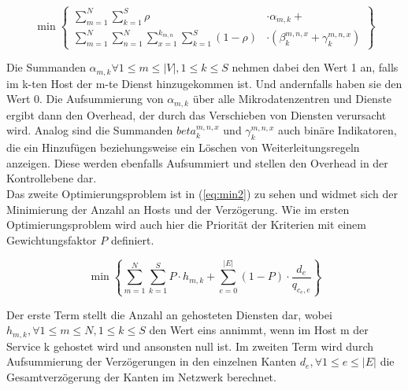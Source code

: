 \documentclass[conference]{IEEEtran}
\begin{document}
\begin{equation}
     \min\left\{\begin{split} \sum\limits_{m=1}^N \sum\limits_{k=1}^S \rho &\cdot\alpha_{m,k} + \\
         \sum\limits_{m=1}^N \sum\limits_{n=1}^N \sum\limits_{x=1}^{k_{m,n}}
\sum\limits_{k=1}^S (1-\rho)&\cdot(\beta_{k}^{m,n,x}+ \gamma_{k}^{m,n,x})\end{split}\right\}
\label{eq:min1}
\end{equation}

Die Summanden \(\alpha_{m,k} \forall 1\le m \le |V|, 1 \le k \le S\) nehmen dabei den Wert 1 an, falls im k-ten Host der m-te Dienst hinzugekommen ist. Und andernfalls haben sie den Wert 0. Die Aufsummierung von \(\alpha_{m,k}\) über alle Mikrodatenzentren und Dienste ergibt dann den Overhead, der durch das Verschieben von Diensten verursacht wird. 
Analog sind die Summanden \(beta_{k}^{m,n,x}\) und \(\gamma_{k}^{m,n,x}\) auch binäre Indikatoren, die ein Hinzufügen beziehungsweise ein Löschen von Weiterleitungsregeln anzeigen. Diese werden ebenfalls Aufsummiert und stellen den Overhead in der Kontrollebene dar.\\
Das zweite Optimierungsproblem ist in (\ref{eq:min2}) zu sehen und widmet sich der Minimierung der Anzahl an Hosts und der Verzögerung. Wie im ersten Optimierungsproblem wird auch hier die Priorität der Kriterien mit einem Gewichtungsfaktor \(P\) definiert.

\begin{equation}
\min \left\{ \sum_{m=1}^N \sum_{k=1}^S P \cdot h_{m,k} + \sum_{e=0}^{|E|} (1-P) \cdot \frac{d_e}{q_{c_{e},e}} \right\}
\label{eq:min2}
\end{equation}

Der erste Term stellt die Anzahl an gehosteten Diensten dar, wobei \(h_{m,k},\forall 1 \le m \le N, 1\le k \le S\) den Wert eins annimmt, wenn im Host m der Service k gehostet wird und ansonsten null ist.
Im zweiten Term wird durch Aufsummierung der Verzögerungen in den einzelnen Kanten \(d_e, \forall 1 \le e \le |E|\) die Gesamtverzögerung der Kanten im Netzwerk berechnet.
\end{document}
